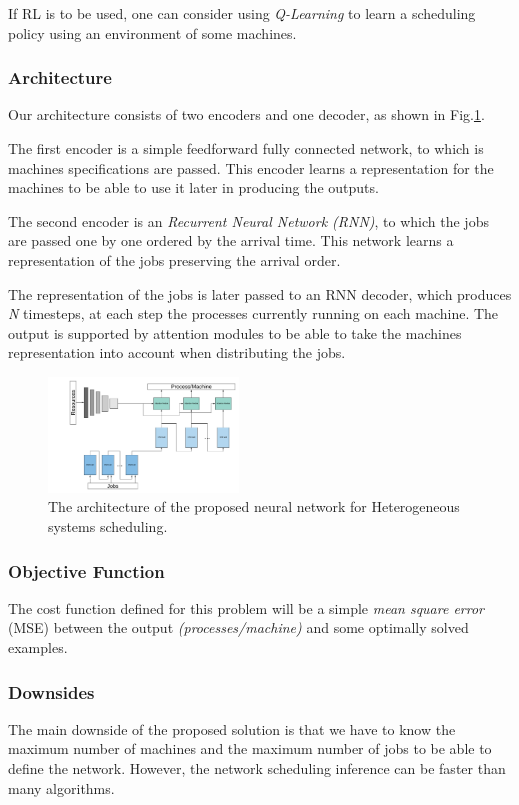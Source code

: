 \documentclass[twocolumn,11pt]{IEEEtran}
\begin{document}
    If RL is to be used, one can consider using \emph{Q-Learning} to learn a scheduling policy using an environment of some machines. 
    
    \subsubsection{Architecture}
    Our architecture consists of two encoders and one decoder, as shown in Fig.\ref{fig:nn}.

    The first encoder is a simple feedforward fully connected network, to which is machines specifications are passed. This encoder learns a representation for the machines to be able to use it later in producing the outputs. 
    
    The second encoder is an \emph{Recurrent Neural Network (RNN)}, to which the jobs are passed one by one ordered by the arrival time. This network learns a representation of the jobs preserving the arrival order. 
    
    The representation of the jobs is later passed to an RNN decoder, which produces \emph{N} timesteps, at each step the processes currently running on each machine. The output is supported by attention modules to be able to take the machines representation into account when distributing the jobs.
    
    \begin{figure}[hp]
        \centering
        \includegraphics[width=0.45\textwidth]{sched_nn}
        \caption{The architecture of the proposed neural network for Heterogeneous systems scheduling.}
        \label{fig:nn}
    \end{figure}
    
    \subsubsection{Objective Function}
    The cost function defined for this problem will be a simple \emph{mean square error} (MSE) between the output \emph{(processes/machine)} and some optimally solved examples.
    
    \subsubsection{Downsides}
    The main downside of the proposed solution is that we have to know the maximum number of machines and the maximum number of jobs to be able to define the network. However, the network scheduling inference can be faster than many algorithms. 
    
\end{document}
